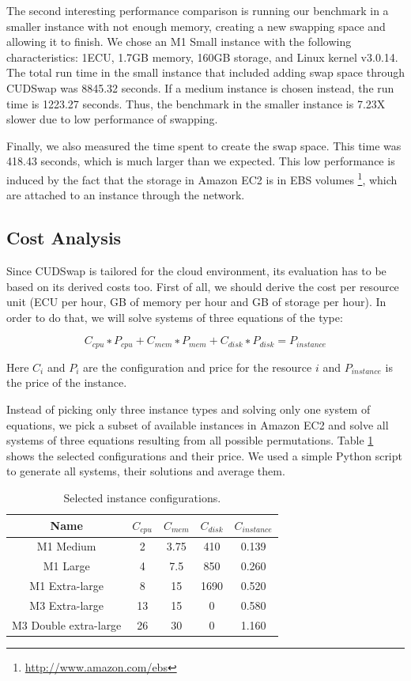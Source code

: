The second interesting performance comparison is running our benchmark in a smaller
instance with not enough memory, creating a new swapping space and allowing it to finish.
We chose an M1 Small instance with the following characteristics: 1ECU, 1.7GB memory,
160GB storage, and Linux kernel v3.0.14. The total run time in the small instance that
included adding swap space through CUDSwap was 8845.32 seconds. If a medium instance
is chosen instead, the run time is 1223.27 seconds. Thus, the benchmark in the smaller
instance is 7.23X slower due to low performance of swapping.

Finally, we also measured the time spent to create the swap space. This time was
418.43 seconds, which is much larger than we expected. This low performance is induced
by the fact that the storage in Amazon EC2 is in EBS volumes \footnote{\url{http://www.amazon.com/ebs}}, which are attached
to an instance through the network.

\subsection{Cost Analysis}\label{subme_cost}

Since CUDSwap is tailored for the cloud environment, its evaluation has to be based
on its derived costs too. First of all, we should derive the cost per resource unit
(ECU per hour, GB of memory per hour and GB of storage per hour). In order to do that,
we will solve systems of three equations of the type:

$$
C_{cpu} ∗ P_{cpu} + C_{mem} ∗ P_{mem} + C_{disk} ∗ P_{disk} = P_{instance}
$$

Here $C_i$ and $P_i$ are the configuration and price for the resource $i$ and $P_{instance}$
is the price of the instance.

Instead of picking only three instance types and solving only one system of equations,
we pick a subset of available instances in Amazon EC2 and solve all systems of three
equations resulting from all possible permutations. Table \ref{metable1} shows the selected
configurations and their price. We used a simple Python script to generate all systems,
their solutions and average them.

\begin{table}[htbp]
\centering
\caption[Selected instance configurations]{Selected instance configurations.}\label{metable1}
\begin{tabular*}{\textwidth}{ccccc}
\toprule
Name & $C_{cpu}$ & $C_{mem}$ & $C_{disk}$ & $C_{instance}$\\
\midrule
M1 Medium & 2 & 3.75 & 410 & 0.139\\
\midrule
M1 Large & 4 & 7.5 & 850 & 0.260\\
\midrule
M1 Extra-large & 8 & 15 & 1690 & 0.520\\
\midrule
M3 Extra-large & 13 & 15 & 0 & 0.580\\
\midrule
M3 Double extra-large & 26 & 30 & 0 & 1.160\\
\bottomrule
\end{tabular*}
\end{table}

